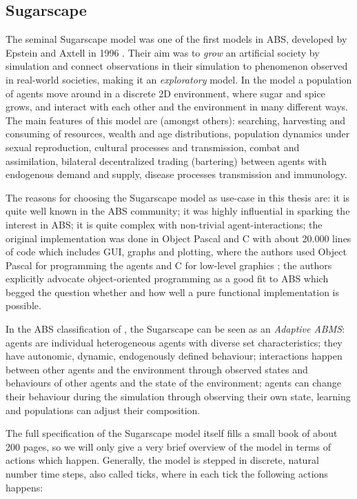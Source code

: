 \subsection{Sugarscape}
\label{sec:sugarscape}

The seminal Sugarscape model was one of the first models in ABS, developed by Epstein and Axtell in 1996 \cite{epstein_growing_1996}. Their aim was to \textit{grow} an artificial society by simulation and connect observations in their simulation to phenomenon observed in real-world societies, making it an \textit{exploratory} model. In the model a population of agents move around in a discrete 2D environment, where sugar and spice grows, and interact with each other and the environment in many different ways. The main features of this model are (amongst others): searching, harvesting and consuming of resources, wealth and age distributions, population dynamics under sexual reproduction, cultural processes and transmission, combat and assimilation, bilateral decentralized trading (bartering) between agents with endogenous demand and supply, disease processes transmission and immunology.

The reasons for choosing the Sugarscape model as use-case in this thesis are: it is quite well known in the ABS community; it was highly influential in sparking the interest in ABS; it is quite complex with non-trivial agent-interactions; the original implementation was done in Object Pascal and C with about 20.000 lines of code which includes GUI, graphs and plotting, where the authors used Object Pascal for programming the agents and C for low-level graphics \cite{axtell_aligning_1996}; the authors explicitly advocate object-oriented programming as a good fit to ABS which begged the question whether and how well a pure functional implementation is possible. 

In the ABS classification of \cite{macal_everything_2016}, the Sugarscape can be seen as an \textit{Adaptive ABMS}: agents are individual heterogeneous agents with diverse set characteristics; they have autonomic, dynamic, endogenously defined behaviour; interactions happen between other agents and the environment through observed states and behaviours of other agents and the state of the environment; agents can change their behaviour during the simulation through observing their own state, learning and populations can adjust their composition.

The full specification of the Sugarscape model itself fills a small book \cite{epstein_growing_1996} of about 200 pages, so we will only give a very brief overview of the model in terms of actions which happen. Generally, the model is stepped in discrete, natural number time steps, also called ticks, where in each tick the following actions happens:

